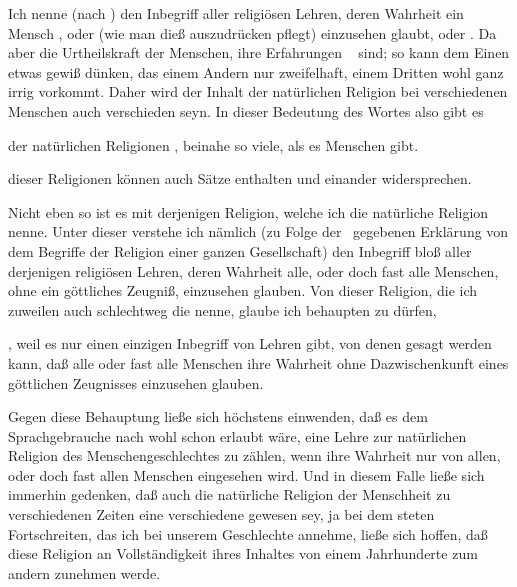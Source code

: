 \begin{aufza} 
\item Ich nenne (nach ) den Inbegriff aller religiösen Lehren, deren Wahrheit ein Mensch , oder (wie man dieß auszudrücken pflegt)  einzusehen glaubt,  oder . Da aber die Urtheilskraft der Menschen, ihre Erfahrungen \usw\  sind; so kann dem Einen etwas gewiß dünken, das einem Andern nur zweifelhaft, einem Dritten wohl ganz irrig vorkommt. Daher wird der Inhalt der natürlichen Religion bei verschiedenen Menschen auch verschieden seyn. In dieser Bedeutung des Wortes also gibt es
\begin{aufzb}
\item der natürlichen Religionen , beinahe so viele, als es Menschen gibt.
\item {} dieser Religionen können auch  Sätze enthalten und einander widersprechen.
\end{aufzb}
\item Nicht eben so ist es mit derjenigen Religion, welche ich die natürliche Religion  nenne. Unter dieser verstehe ich nämlich (zu Folge der \ gegebenen Erklärung von dem Begriffe der Religion einer ganzen Gesellschaft) den Inbegriff bloß aller derjenigen religiösen Lehren, deren Wahrheit alle, oder doch fast alle Menschen, ohne ein göttliches Zeugniß, einzusehen glauben. Von dieser Religion, die ich zuweilen auch schlechtweg die  nenne, glaube ich behaupten zu dürfen,~
\begin{aufzb}
\item {}, weil es nur einen einzigen Inbegriff von Lehren gibt, von denen gesagt werden kann, daß alle oder fast alle Menschen ihre Wahrheit ohne Dazwischenkunft eines göttlichen Zeugnisses einzusehen glauben.
\begin{RWanm}
Gegen diese Behauptung ließe sich höchstens einwenden, daß es dem Sprachgebrauche nach wohl schon erlaubt wäre, eine Lehre zur natürlichen Religion des Menschengeschlechtes zu zählen, wenn ihre Wahrheit nur von allen, oder doch fast allen Menschen  eingesehen wird. Und in diesem Falle ließe sich immerhin gedenken, daß auch die natürliche Religion der Menschheit zu verschiedenen Zeiten eine verschiedene gewesen sey, ja bei dem steten Fortschreiten, das ich bei unserem Geschlechte annehme, ließe sich hoffen, daß diese Religion an Vollständigkeit ihres Inhaltes von einem Jahrhunderte zum andern zunehmen werde.

\end{RWanm}
\end{aufzb}
\end{aufza}
